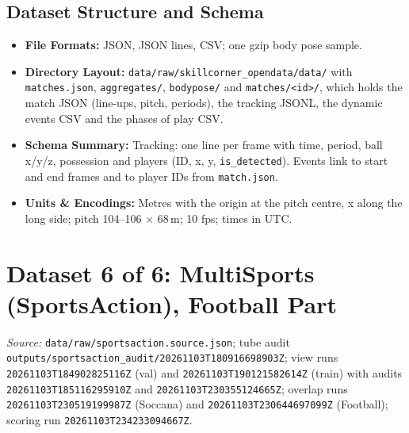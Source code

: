 \documentclass[11pt, a4paper]{article}
\newif\ifreportednoted
\newcommand{\resetreported}{\global\reportednotedfalse}
\begin{document}
\subsection{Dataset Structure and Schema}
\begin{itemize}
    \item \textbf{File Formats:} JSON, JSON lines, CSV; one gzip body pose sample.
    \item \textbf{Directory Layout:} \texttt{data/raw/}\allowbreak\texttt{skillcorner\_opendata/data/} with \texttt{matches.json}, \texttt{aggregates/}, \texttt{bodypose/} and \texttt{matches/<id>/}, which holds the match JSON (line-ups, pitch, periods), the tracking JSONL, the dynamic events CSV and the phases of play CSV.
    \item \textbf{Schema Summary:} Tracking: one line per frame with time, period, ball x/y/z, possession and players (ID, x, y, \texttt{is\_detected}). Events link to start and end frames and to player IDs from \texttt{match.json}.
    \item \textbf{Units \& Encodings:} Metres with the origin at the pitch centre, x along the long side; pitch 104--106 $\times$ 68\,m; 10 fps; times in UTC.
\end{itemize}

\section{Dataset 6 of 6: MultiSports (SportsAction), Football Part}
\resetreported

\begin{sloppypar}\noindent\textit{Source:} \texttt{data/raw/}\allowbreak\texttt{sportsaction.source.json}; tube audit \texttt{outputs/}\allowbreak\texttt{sportsaction\_audit/}\allowbreak\texttt{20261103T180916698903Z}; view runs \texttt{20261103T184902825116Z} (val) and \texttt{20261103T190121582614Z} (train) with audits \texttt{20261103T185116295910Z} and \texttt{20261103T230355124665Z}; overlap runs \texttt{20261103T230519199987Z} (Soccana) and \texttt{20261103T230644697099Z} (Football); scoring run \texttt{20261103T234233094667Z}.\end{sloppypar}
\end{document}
